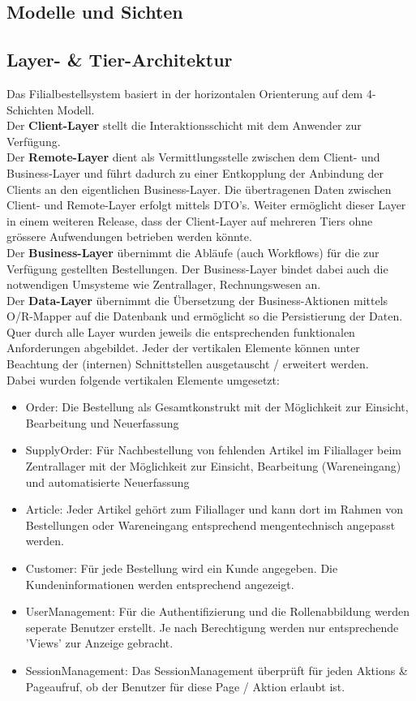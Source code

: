 \subsection{Modelle und Sichten}

\subsection{Layer- \& Tier-Architektur}
Das Filialbestellsystem basiert in der horizontalen Orienterung auf dem 4-Schichten Modell. \\
Der \textbf{Client-Layer} stellt die Interaktionsschicht mit dem Anwender zur Verfügung.\\
Der \textbf{Remote-Layer} dient als Vermittlungsstelle zwischen dem Client- und Business-Layer und führt dadurch zu einer Entkopplung der Anbindung der Clients an den eigentlichen Business-Layer. Die übertragenen Daten zwischen Client- und Remote-Layer erfolgt mittels DTO's. Weiter ermöglicht dieser Layer in einem weiteren Release, dass der Client-Layer auf mehreren Tiers ohne grössere Aufwendungen betrieben werden könnte.\\
Der \textbf{Business-Layer} übernimmt die Abläufe (auch Workflows) für die zur Verfügung gestellten Bestellungen. Der Business-Layer bindet dabei auch die notwendigen Umsysteme wie Zentrallager, Rechnungswesen an.\\
Der \textbf{Data-Layer} übernimmt die Übersetzung der Business-Aktionen mittels O/R-Mapper auf die Datenbank und ermöglicht so die Persistierung der Daten.\\
Quer durch alle Layer wurden jeweils die entsprechenden funktionalen Anforderungen abgebildet. Jeder der vertikalen Elemente können unter Beachtung der (internen) Schnittstellen ausgetauscht / erweitert werden.\\
Dabei wurden folgende vertikalen Elemente umgesetzt:
\begin{itemize}
	\item Order: Die Bestellung als Gesamtkonstrukt mit der Möglichkeit zur Einsicht, Bearbeitung und Neuerfassung
	\item SupplyOrder: Für Nachbestellung von fehlenden Artikel im Filiallager beim Zentrallager mit der Möglichkeit zur Einsicht, Bearbeitung (Wareneingang) und automatisierte Neuerfassung
	\item Article: Jeder Artikel gehört zum Filiallager und kann dort im Rahmen von Bestellungen oder Wareneingang entsprechend mengentechnisch angepasst werden.  
	\item Customer: Für jede Bestellung wird ein Kunde angegeben. Die Kundeninformationen werden entsprechend angezeigt.
	\item UserManagement: Für die Authentifizierung und die Rollenabbildung werden seperate Benutzer erstellt. Je nach Berechtigung werden nur entsprechende 'Views' zur Anzeige gebracht.
	\item SessionManagement: Das SessionManagement überprüft für jeden Aktions \& Pageaufruf, ob der Benutzer für diese Page / Aktion erlaubt ist.
\end{itemize}

